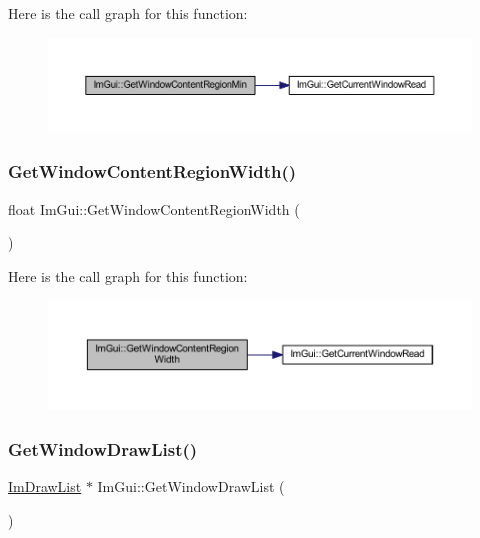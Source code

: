 Here is the call graph for this function\+:
\nopagebreak
\begin{figure}[H]
\begin{center}
\leavevmode
\includegraphics[width=350pt]{namespace_im_gui_a790123aa15c266798f35050ba36b7197_cgraph}
\end{center}
\end{figure}
\mbox{\label{namespace_im_gui_a87c1de99e670bff87c43bfb07bbf898f}} 
\subsubsection{\texorpdfstring{Get\+Window\+Content\+Region\+Width()}{GetWindowContentRegionWidth()}}
{\footnotesize\ttfamily float Im\+Gui\+::\+Get\+Window\+Content\+Region\+Width (\begin{DoxyParamCaption}{ }\end{DoxyParamCaption})}

Here is the call graph for this function\+:
\nopagebreak
\begin{figure}[H]
\begin{center}
\leavevmode
\includegraphics[width=350pt]{namespace_im_gui_a87c1de99e670bff87c43bfb07bbf898f_cgraph}
\end{center}
\end{figure}
\mbox{\label{namespace_im_gui_aa100c22a9feafe843fa12c66590cbda0}} 
\subsubsection{\texorpdfstring{Get\+Window\+Draw\+List()}{GetWindowDrawList()}}
{\footnotesize\ttfamily \mbox{\hyperlink{struct_im_draw_list}{Im\+Draw\+List}} $\ast$ Im\+Gui\+::\+Get\+Window\+Draw\+List (\begin{DoxyParamCaption}{ }\end{DoxyParamCaption})}

